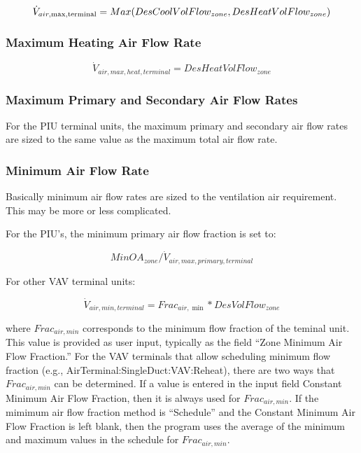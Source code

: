 \begin{equation}
{\dot V_{air,\max ,{\rm{terminal}}}} = Max(DesCoolVolFlow_{zone},DesHeatVolFlow_{zone})
\end{equation}

\subsubsection{Maximum Heating Air Flow Rate}\label{maximum-heating-air-flow-rate}

\begin{equation}
{\dot V_{air,max,heat,terminal}} = DesHeatVolFlow_{zone}
\end{equation}

\subsubsection{Maximum Primary and Secondary Air Flow Rates}\label{maximum-primary-and-secondary-air-flow-rates}

For the PIU terminal units, the maximum primary and secondary air flow rates are sized to the same value as the maximum total air flow rate.

\subsubsection{Minimum Air Flow Rate}\label{minimum-air-flow-rate}

Basically minimum air flow rates are sized to the ventilation air requirement. This may be more or less complicated.

For the PIU's, the minimum primary air flow fraction is set to:

\begin{equation}
{MinOA}_{zone} /{\dot V_{air,max,primary,terminal}}
\end{equation}

For other VAV terminal units:

\begin{equation}
{\dot V_{air,min,terminal}} = Fra{c_{air,\min }}*DesVolFlow_{zone}
\end{equation}

where \emph{\(Frac_{air,min}\)} corresponds to the minimum flow fraction of the teminal unit. This value is provided as user input, typically as the field ``Zone Minimum Air Flow Fraction.'' For the VAV terminals that allow scheduling minimum flow fraction (e.g., AirTerminal:SingleDuct:VAV:Reheat), there are two ways that \emph{\(Frac_{air,min}\)} can be determined. If a value is entered in the input field Constant Minimum Air Flow Fraction, then it is always used for \emph{\(Frac_{air,min}\)}. If the mimimum air flow fraction method is ``Schedule'' and the Constant Minimum Air Flow Fraction is left blank, then the program uses the average of the minimum and maximum values in the schedule for \emph{\(Frac_{air,min}\)}.

